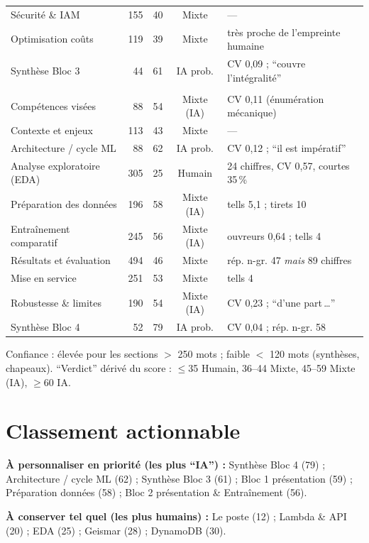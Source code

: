 \documentclass[11pt,a4paper]{article}
\newcommand{\hum}[1]{\textcolor{ok}{#1}}
\newcommand{\iaa}[1]{\textcolor{flag}{#1}}
\newcommand{\mixx}[1]{\textcolor{mix}{#1}}
\begin{document}
\begin{center}
\begin{tabularx}{\linewidth}{Y r c c Y}
Sécurité \& IAM & 155 & 40 & Mixte & — \\
Optimisation coûts & 119 & 39 & Mixte & très proche de l'empreinte humaine \\
Synthèse Bloc 3 & 44 & \iaa{61} & \iaa{IA prob.} & CV 0,09 ; \enquote{couvre l'intégralité} \\
\midrule
{}\\
Compétences visées & 88 & 54 & \mixx{Mixte (IA)} & CV 0,11 (énumération mécanique) \\
Contexte et enjeux & 113 & 43 & Mixte & — \\
Architecture / cycle ML & 88 & \iaa{62} & \iaa{IA prob.} & CV \iaa{0,12} ; \enquote{il est impératif} \\
Analyse exploratoire (EDA) & 305 & 25 & \hum{Humain} & 24 chiffres, CV 0,57, courtes 35\,\% \\
Préparation des données & 196 & 58 & \mixx{Mixte (IA)} & tells 5,1 ; tirets 10 \\
Entraînement comparatif & 245 & 56 & \mixx{Mixte (IA)} & ouvreurs 0,64 ; tells 4 \\
Résultats et évaluation & 494 & 46 & Mixte & rép. n-gr. 47 \emph{mais} 89 chiffres \\
Mise en service & 251 & 53 & Mixte & tells 4 \\
Robustesse \& limites & 190 & 54 & \mixx{Mixte (IA)} & CV 0,23 ; \enquote{d'une part\,\dots} \\
Synthèse Bloc 4 & 52 & \iaa{79} & \iaa{IA prob.} & CV \iaa{0,04} ; rép. n-gr. \iaa{58} \\
\bottomrule
\end{tabularx}
\end{center}
\footnotesize Confiance : élevée pour les sections $>$ 250 mots ; faible $<$ 120 mots
(synthèses, chapeaux). \enquote{Verdict} dérivé du score : \hum{$\leq$35 Humain},
36--44 Mixte, \mixx{45--59 Mixte (IA)}, \iaa{$\geq$60 IA}.
\normalsize

\section{Classement actionnable}
\textbf{À personnaliser en priorité (les plus \enquote{IA}) :}
Synthèse Bloc 4 (79) ; Architecture / cycle ML (62) ; Synthèse Bloc 3 (61) ;
Bloc 1 présentation (59) ; Préparation données (58) ; Bloc 2 présentation \& Entraînement (56).

\smallskip
\textbf{À conserver tel quel (les plus humains) :}
Le poste (12) ; Lambda \& API (20) ; EDA (25) ; Geismar (28) ; DynamoDB (30).
\end{document}

